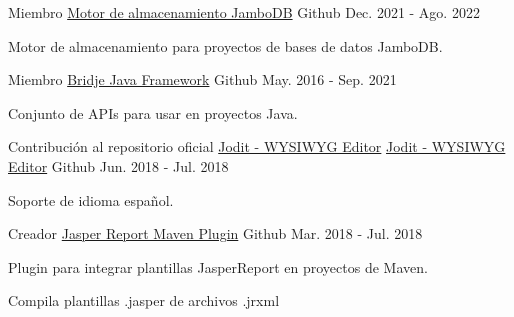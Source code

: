 
\begin{cventries}

  \cventry
    {Miembro} %
    {\href{https://github.com/jambodb/jambodb-storage}{Motor de almacenamiento JamboDB}} %
    {\faGithubSquare\acvHeaderIconSep Github} %
    {Dec. 2021 - Ago. 2022} %
    {
      \begin{cvitems} %
        \item {Motor de almacenamiento para proyectos de bases de datos JamboDB.}
      \end{cvitems}
    }

  \cventry
    {Miembro} %
    {\href{https://github.com/touwolf/bridje-framework}{Bridje Java Framework}} %
    {\faGithubSquare\acvHeaderIconSep Github} %
    {May. 2016 - Sep. 2021} %
    {
      \begin{cvitems} %
        \item {Conjunto de APIs para usar en proyectos Java.}
      \end{cvitems}
    }

  \cventry
    {Contribución al repositorio oficial \href{https://github.com/xdan/jodit}{Jodit - WYSIWYG Editor}} %
    {\href{https://github.com/zp1ke/jodit}{Jodit - WYSIWYG Editor}} %
    {\faGithubSquare\acvHeaderIconSep Github} %
    {Jun. 2018 - Jul. 2018} %
    {
      \begin{cvitems} %
        \item {Soporte de idioma español.}
      \end{cvitems}
    }

  \cventry
    {Creador} %
    {\href{https://github.com/zp1ke/jasperreport-maven-plugin}{Jasper Report Maven Plugin}} %
    {\faGithubSquare\acvHeaderIconSep Github} %
    {Mar. 2018 - Jul. 2018} %
    {
      \begin{cvitems} %
        \item {Plugin para integrar plantillas JasperReport en proyectos de Maven.}
        \item {Compila plantillas .jasper de archivos .jrxml}
      \end{cvitems}
    }


\end{cventries}
